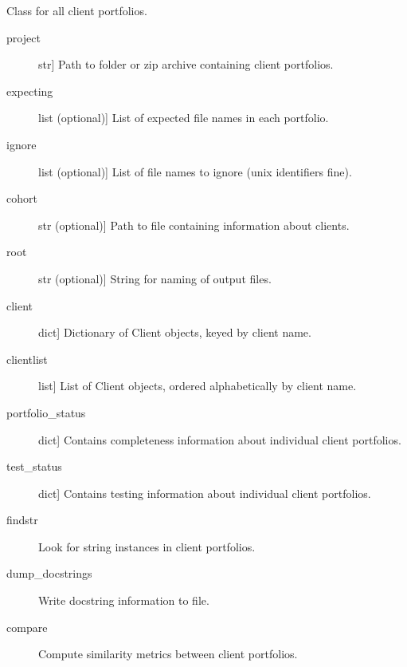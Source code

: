 \documentclass[letterpaper,10pt,english]{sphinxmanual}
\begin{document}
\begin{fulllineitems}
\label{\detokenize{index:unicity.Project}}
Class for all client portfolios.
\begin{description}
\item[{project}] \leavevmode{[}str{]}
Path to folder or zip archive containing client portfolios.

\item[{expecting}] \leavevmode{[}list (optional){]}
List of expected file names in each portfolio.

\item[{ignore}] \leavevmode{[}list (optional){]}
List of file names to ignore (unix identifiers fine).

\item[{cohort}] \leavevmode{[}str (optional){]}
Path to file containing information about clients.

\item[{root}] \leavevmode{[}str (optional){]}
String for naming of output files.

\end{description}
\begin{description}
\item[{client}] \leavevmode{[}dict{]}
Dictionary of Client objects, keyed by client name.

\item[{clientlist}] \leavevmode{[}list{]}
List of Client objects, ordered alphabetically by client name.

\item[{portfolio\_status}] \leavevmode{[}dict{]}
Contains completeness information about individual client portfolios.

\item[{test\_status}] \leavevmode{[}dict{]}
Contains testing information about individual client portfolios.

\end{description}
\begin{description}
\item[{findstr}] \leavevmode
Look for string instances in client portfolios.

\item[{dump\_docstrings}] \leavevmode
Write docstring information to file.

\item[{compare}] \leavevmode
Compute similarity metrics between client portfolios.


\end{description}
\end{fulllineitems}
\end{document}
